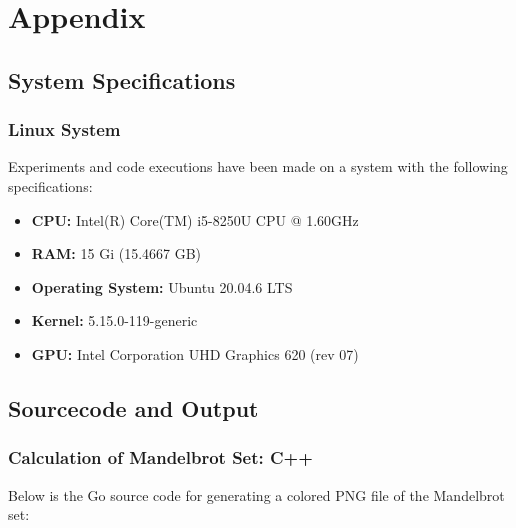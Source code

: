 \chapter{Appendix}

\section{System Specifications}

\subsection{Linux System}
\label{app:system:mymachine}
Experiments and code executions have been made on a system with the following specifications:

\begin{itemize}
    \item \textbf{CPU:} Intel(R) Core(TM) i5-8250U CPU @ 1.60GHz
    \item \textbf{RAM:} 15 Gi (15.4667 GB)
    \item \textbf{Operating System:} Ubuntu 20.04.6 LTS
    \item \textbf{Kernel:} 5.15.0-119-generic
    \item \textbf{GPU:} Intel Corporation UHD Graphics 620 (rev 07)
\end{itemize}

\section{Sourcecode and Output}

\subsection{Calculation of Mandelbrot Set: C++}
\label{app:code:mandelbrot1}
Below is the Go source code for generating a colored PNG file of the Mandelbrot set:

